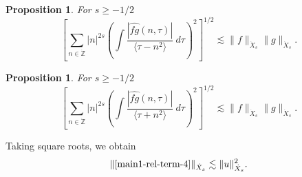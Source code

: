 \documentclass[12pt,reqno]{amsart}
\numberwithin{equation}{section}  %
\renewcommand{\cref}{\Cref}
\newcommand{\zz}{\mathbb{Z}}
\newcommand{\zzdot}{\dot{\zz}}
\newcommand{\wh}{\widehat}
\newtheorem{proposition}[theorem]{Proposition}
\begin{document}
\begin{proposition}
\label{prop:bilin-1-endpoint}
For $s \ge -1/2$
\begin{equation}
\left [ \sum_{n \in \zzdot} |n|^{2s}  \left ( \int
\frac{|\wh{fg}(n, \tau) |}{\langle \tau - n^{2} \rangle}
\ d\tau \right )^2 \right ]^{1/2} \lesssim \| f \|_{\dot{X}_{s}} \| g \|_{\dot{X}_{s}}.
\end{equation}
\end{proposition}
\begin{proposition}
\label{prop:bilin-2-endpoint}
For $s \ge -1/2$
\begin{equation}
\left [ \sum_{n \in \zzdot} |n|^{2s}  \left ( \int
\frac{|\wh{fg}(n, \tau) |}{\langle \tau + n^{2} \rangle}
\ d\tau \right )^2 \right ]^{1/2} \lesssim \| f \|_{\dot{X}_{s}} \| g \|_{\dot{X}_{s}}.
\end{equation}
\end{proposition}
Taking square roots, we obtain
\begin{equation}
\label{main-int4-est}
\begin{split}
\|\cref{main1-rel-term-4}\|_{\dot{X}_{s}} \lesssim 
\|u\|^{2}_{\dot{X}_{s}}.
\end{split}
\end{equation}
\end{document}
